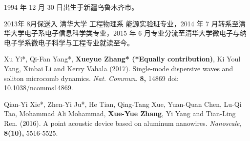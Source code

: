 \begin{resume}


  1994 年 12 月 30 日出生于新疆乌鲁木齐市。

  2013年 8月保送入 清华大学 工程物理系 能源实验班专业，2014 年 7 月转系至清华大学电子系电子信息科学类专业，2015 年 6 月专业分流至清华大学微电子与纳电子学系微电子科学与工程专业就读至今。


  \begin{publications}
    \item Xu Yi*, Qi-Fan Yang*, \textbf{Xueyue Zhang* (*Equally contribution)}, Ki Youl Yang, Xinbai Li and
Kerry Vahala (2017). Single-mode dispersive waves and soliton microcomb dynamics. \textit{Nat. Commun.} \textbf{8,}  14869 doi: 10.1038/ncomms14869.
    \item Qian-Yi Xie*, Zhen-Yi Ju*, He Tian, Qing-Tang Xue, Yuan-Quan Chen, Lu-Qi Tao, Mohammad Ali
Mohammad, \textbf{Xue-Yue Zhang}, Yi Yang and Tian-Ling Ren. (2016). A point acoustic device based on aluminum nanowires. \textit{Nanoscale,}  \textbf{8(10),}  5516-5525.
  \end{publications}

\end{resume}
